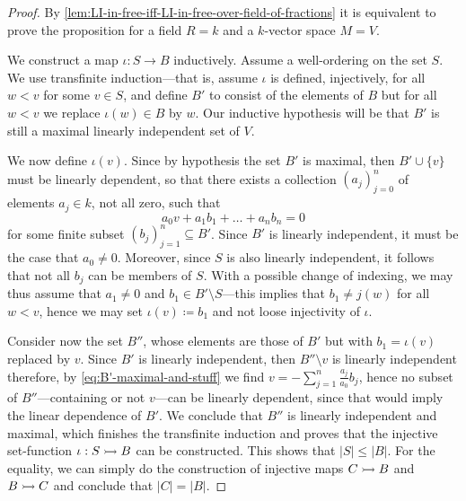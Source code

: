 \begin{proof}
    By \cref{lem:LI-in-free-iff-LI-in-free-over-field-of-fractions} it is equivalent
    to prove the proposition for a field \(R = k\) and a \(k\)-vector space
    \(M = V\).

    We construct a map \(\iota: S \to B\) inductively. Assume a well-ordering on the
    set \(S\). We use transfinite induction---that is, assume \(\iota\) is defined,
    injectively, for all \(w < v\) for some \(v \in S\), and define \(B'\) to
    consist of the elements of \(B\) but for all \(w < v\) we replace
    \(\iota(w) \in B\) by \(w\). Our inductive hypothesis will be that \(B'\) is
    still a maximal linearly independent set of \(V\).

    We now define \(\iota(v)\). Since by hypothesis the set \(B'\) is maximal, then
    \(B' \cup \{v\}\) must be linearly dependent, so that there exists a collection
    \((a_{j})_{j=0}^n\) of elements \(a_j \in k\), not all zero, such that
    \begin{equation}\label{eq:B'-maximal-and-stuff}
        a_0 v + a_1 b_1 + \dots + a_n b_n = 0
    \end{equation}
    for some finite subset \((b_j)_{j=1}^n \subseteq B'\). Since \(B'\) is linearly
    independent, it must be the case that \(a_0 \neq 0\). Moreover, since \(S\) is
    also linearly independent, it follows that not all \(b_j\) can be members of
    \(S\). With a possible change of indexing, we may thus assume that
    \(a_1 \neq 0\) and \(b_1 \in B' \setminus S\)---this implies that
    \(b_1 \neq j(w)\) for all \(w < v\), hence we may set \(\iota(v) \coloneq b_1\)
    and not loose injectivity of \(\iota\).

    Consider now the set \(B''\), whose elements are those of \(B'\) but with
    \(b_1 = \iota(v)\) replaced by \(v\). Since \(B'\) is linearly independent, then
    \(B'' \setminus v\) is linearly independent therefore, by
    \cref{eq:B'-maximal-and-stuff} we find \(v = -\sum_{j=1}^n \frac{a_j}{a_0}
    b_j\), hence no subset of \(B''\)---containing or not \(v\)---can be linearly
    dependent, since that would imply the linear dependence of \(B'\). We conclude
    that \(B''\) is linearly independent and maximal, which finishes the transfinite
    induction and proves that the injective set-function \(\iota: S \rightarrowtail B\) can be
    constructed. This shows that \(|S| \leq |B|\). For the equality, we can simply
    do the construction of injective maps \(C \rightarrowtail B\) and \(B \rightarrowtail C\) and
    conclude that \(|C| = |B|\).
\end{proof}

